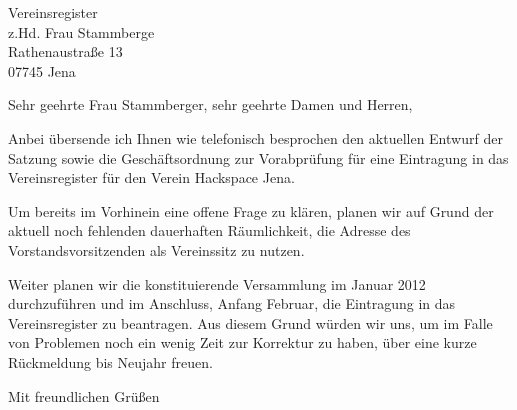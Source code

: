 \documentclass[fontsize=12pt,paper=a4,DIN]{scrlttr2}
\begin{document}
\begin{letter}{Vereinsregister \\ 
	z.Hd. Frau Stammberge \\ 
	Rathenaustraße 13 \\ 
	07745 Jena}


\opening{Sehr geehrte Frau Stammberger, sehr geehrte Damen und Herren,}

Anbei übersende ich Ihnen wie telefonisch besprochen den aktuellen 
Entwurf der Satzung sowie die Geschäftsordnung zur Vorabprüfung für 
eine Eintragung in das Vereinsregi\-ster für den Verein Hackspace 
Jena. 

Um bereits im Vorhinein eine offene Frage zu klären, planen wir auf 
Grund der aktuell noch fehlenden dauerhaften Räumlichkeit, die 
Adresse des Vorstandsvorsitzenden als Vereinssitz zu nutzen. 

Weiter planen wir die konstituierende Versammlung im Januar 2012 
durchzuführen und im Anschluss, Anfang Februar, die Eintragung in 
das Vereinsregister zu beantragen. Aus diesem Grund würden wir uns, 
um im Falle von Problemen noch ein wenig Zeit zur Korrektur zu haben,
über eine kurze Rückmeldung bis Neujahr freuen. 


\closing{Mit freundlichen Grüßen}

\end{letter}
\end{document}
